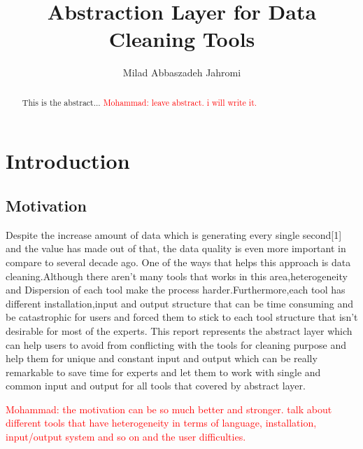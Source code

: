 \documentclass[12pt]{article}
\title{Abstraction Layer for Data Cleaning Tools}
\author{Milad Abbaszadeh Jahromi\inst{1}}
\newcommand{\mohammad}[1]{\textcolor{red}{Mohammad: #1}}
\begin{document}
 
\maketitle


\begin{abstract} 
	This is the abstract...
	\mohammad{leave abstract. i will write it.}
		
\end{abstract}


\section{Introduction}
\label{section:introduction}

\subsection{Motivation}
Despite the increase amount of data which is generating every  single second[1] and the value has made out of that, the data quality is even more important in compare to several decade ago. One of the ways that helps this approach is data cleaning.Although there aren't many tools that works in this area,heterogeneity and Dispersion of each tool make the process harder.Furthermore,each tool has different installation,input and output structure that can be time consuming and be catastrophic for users and forced them to stick to each tool structure that isn't desirable for most of the experts. 
This report represents the abstract layer which can help users to avoid from conflicting with the tools for cleaning purpose and help them for unique and constant input and output which can be really remarkable to save time for experts and let them to work with single and common input and output for all tools that covered by abstract layer.

\mohammad{the motivation can be so much better and stronger. talk about different tools that have heterogeneity in terms of language, installation, input/output system and so on and the user difficulties.}
\end{document}
